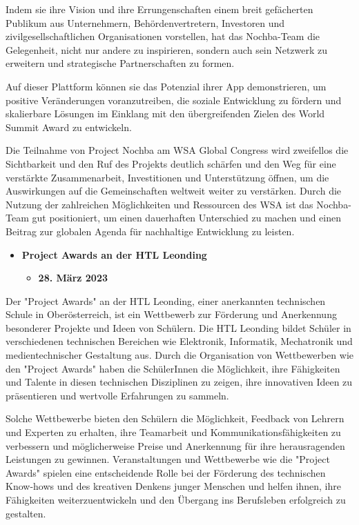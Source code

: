 Indem sie ihre Vision und ihre Errungenschaften einem breit gefächerten Publikum aus Unternehmern, Behördenvertretern, Investoren und zivilgesellschaftlichen Organisationen vorstellen, hat das Nochba-Team die Gelegenheit, nicht nur andere zu inspirieren, sondern auch sein Netzwerk zu erweitern und strategische Partnerschaften zu formen. 

Auf dieser Plattform können sie das Potenzial ihrer App demonstrieren, um positive Veränderungen voranzutreiben, die soziale Entwicklung zu fördern und skalierbare Lösungen im Einklang mit den übergreifenden Zielen des World Summit Award zu entwickeln.

Die Teilnahme von Project Nochba am WSA Global Congress wird zweifellos die Sichtbarkeit und den Ruf des Projekts deutlich schärfen und den Weg für eine verstärkte Zusammenarbeit, Investitionen und Unterstützung öffnen, um die Auswirkungen auf die Gemeinschaften weltweit weiter zu verstärken. Durch die Nutzung der zahlreichen Möglichkeiten und Ressourcen des WSA ist das Nochba-Team gut positioniert, um einen dauerhaften Unterschied zu machen und einen Beitrag zur globalen Agenda für nachhaltige Entwicklung zu leisten.

\begin{itemize}
    \item \textbf{Project Awards an der HTL Leonding}
    \begin{itemize}
        \item \textbf{28. März 2023}
    \end{itemize}
\end{itemize}

Der "Project Awards" an der HTL Leonding, einer anerkannten technischen Schule in Oberösterreich, ist ein Wettbewerb zur Förderung und Anerkennung besonderer Projekte und Ideen von Schülern. Die HTL Leonding bildet Schüler in verschiedenen technischen Bereichen wie Elektronik, Informatik, Mechatronik und medientechnischer Gestaltung aus. Durch die Organisation von Wettbewerben wie den "Project Awards" haben die SchülerInnen die Möglichkeit, ihre Fähigkeiten und Talente in diesen technischen Disziplinen zu zeigen, ihre innovativen Ideen zu präsentieren und wertvolle Erfahrungen zu sammeln.

Solche Wettbewerbe bieten den Schülern die Möglichkeit, Feedback von Lehrern und Experten zu erhalten, ihre Teamarbeit und Kommunikationsfähigkeiten zu verbessern und möglicherweise Preise und Anerkennung für ihre herausragenden Leistungen zu gewinnen. Veranstaltungen und Wettbewerbe wie die "Project Awards" spielen eine entscheidende Rolle bei der Förderung des technischen Know-hows und des kreativen Denkens junger Menschen und helfen ihnen, ihre Fähigkeiten weiterzuentwickeln und den Übergang ins Berufsleben erfolgreich zu gestalten. 

